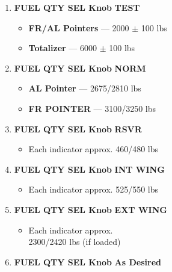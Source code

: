\begin{checklistenumerate}[resume]
    \begin{enumerate}
        \item \textbf{FUEL QTY SEL Knob} \dotfill \textbf{TEST}
        \begin{itemize}
            \item \textbf{FR/AL Pointers} --- 2000 $\pm$ 100 lbs
            \item \textbf{Totalizer} --- 6000 $\pm$ 100 lbs
        \end{itemize}
        \item \textbf{FUEL QTY SEL Knob} \dotfill \textbf{NORM}
        \begin{itemize}
            \item \textbf{AL Pointer} --- 2675/2810 lbs
            \item \textbf{FR POINTER} --- 3100/3250 lbs
        \end{itemize}
        \item \textbf{FUEL QTY SEL Knob} \dotfill \textbf{RSVR}
        \begin{itemize}
            \item Each indicator approx. 460/480 lbs
        \end{itemize}
        \item \textbf{FUEL QTY SEL Knob} \dotfill \textbf{INT WING}
        \begin{itemize}
            \item Each indicator approx. 525/550 lbs
        \end{itemize}
        \item \textbf{FUEL QTY SEL Knob} \dotfill \textbf{EXT WING}
        \begin{itemize}
            \item Each indicator approx.\\
            \hfill 2300/2420 lbs  (if loaded)
        \end{itemize}
        \item \textbf{FUEL QTY SEL Knob} \dotfill \textbf{As Desired}
    \end{enumerate}
\end{checklistenumerate}
